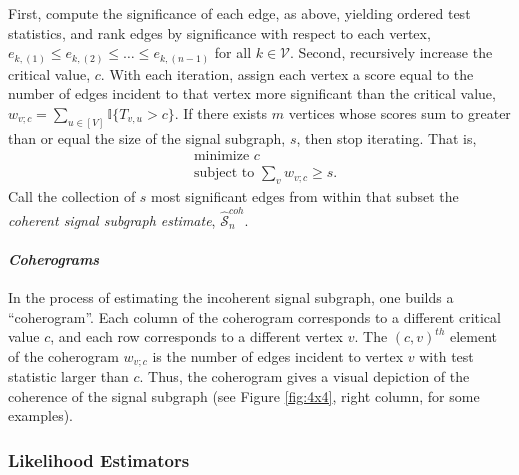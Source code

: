\documentclass[10pt,journal,cspaper,compsoc]{IEEEtran}
\newcommand{\II}{\mathbb{I}}           %
\providecommand{\mc}[1]{\mathcal{#1}}
\providecommand{\mhc}[1]{\widehat{\mathcal{#1}}}
\begin{document}
First, compute the significance of each edge, as above, yielding ordered test statistics, and rank edges by significance with respect to each vertex,  $e_{k,(1)} \leq e_{k,(2)} \leq \ldots \leq e_{k,(n-1)}$ for all $k \in \mc{V}$.  Second, recursively increase the critical value, $c$. With each iteration, assign each vertex a score equal to the number of edges incident to that vertex more significant than the critical value, $w_{v;c}=\sum_{u \in [V]} \II\{T_{v,u} > c\}$.  If there exists $m$ vertices whose scores sum to greater than or equal the size of the signal subgraph, $s$, then stop iterating.  That is,
\begin{align}
	&\text{minimize } c \nonumber \\
	&\text{subject to } \sum_{v} w_{v;c}\geq s.
\end{align}
Call the collection of $s$ most significant edges from within that subset the \emph{coherent signal subgraph estimate}, $\mhc{S}^{coh}_n$. %

\paragraph{\emph{Coherograms}}

In the process of estimating the incoherent signal subgraph, one builds a ``coherogram''.  Each column of the coherogram corresponds to a different critical value $c$, and each row corresponds to a different vertex $v$.  The $(c,v)^{th}$ element of the coherogram $w_{v;c}$ is the number of edges incident to vertex $v$ with test statistic larger than $c$.  Thus, the coherogram gives a visual depiction of the coherence of the signal subgraph (see Figure \ref{fig:4x4}, right column, for some examples).


\subsubsection{Likelihood Estimators} %
\label{sub:likelihood}
\end{document}
